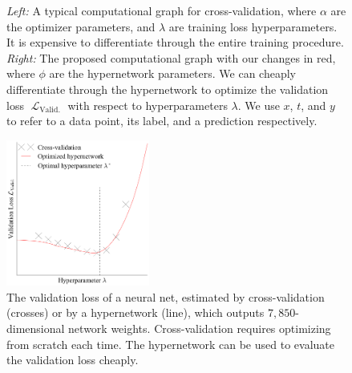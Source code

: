 \documentclass{article} %
\newcommand{\param}{\mathrm{w}} %
\newcommand{\hyper}{\lambda} %
\newcommand{\lossSymbol}{\mathop{\mathcal{L}}} %
\newcommand{\lossSymbolOuter}{\lossSymbol_{\mathrm{Valid.}}} %
\newcommand{\responseParam}{\phi} %
\begin{document}
\begin{figure}
\caption{%
\emph{Left:} A typical computational graph for cross-validation, where $\alpha$ are the optimizer parameters, and $\hyper$ are training loss hyperparameters.
It is expensive to differentiate through the entire training procedure.
\emph{Right:} The proposed computational graph with our changes in {\color{red} red}, where $\responseParam$ are the hypernetwork parameters.
We can cheaply differentiate through the hypernetwork to optimize the validation loss $\lossSymbolOuter$ with respect to hyperparameters $\hyper$.
We use $x$, $t$, and $y$ to refer to a data point, its label, and a prediction respectively.}
\end{figure}
%
\begin{figure}
	\centering
	\includegraphics[width=0.42\textwidth]{hypernets_global_small.png}
	\caption{
	The validation loss of a neural net, estimated by cross-validation (crosses) or by a hypernetwork (line), which outputs $7,850$-dimensional network weights.
	Cross-validation requires optimizing from scratch each time.
	The hypernetwork can be used to evaluate the validation loss cheaply.
	\label{fig:exp1}
	}
\end{figure}
\end{document}
